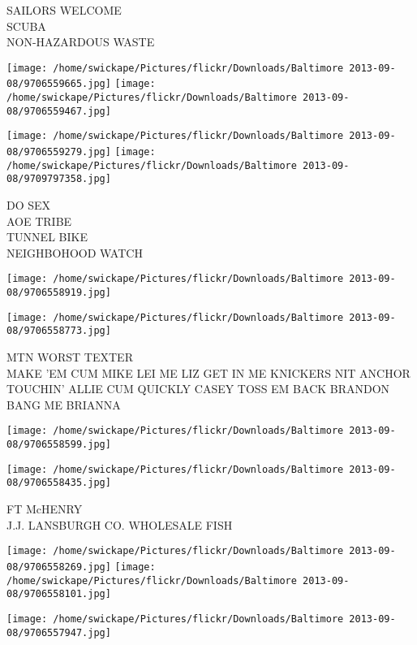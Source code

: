 \documentclass[10pt,letterpaper]{article}
\begin{document}
SAILORS WELCOME\\
SCUBA\\
NON{-}HAZARDOUS WASTE\\
\pagebreak

\texttt{[image: /home/swickape/Pictures/flickr/Downloads/Baltimore 2013-09-08/9706559665.jpg]}
\texttt{[image: /home/swickape/Pictures/flickr/Downloads/Baltimore 2013-09-08/9706559467.jpg]}

\texttt{[image: /home/swickape/Pictures/flickr/Downloads/Baltimore 2013-09-08/9706559279.jpg]}
\texttt{[image: /home/swickape/Pictures/flickr/Downloads/Baltimore 2013-09-08/9709797358.jpg]}

DO SEX\\
AOE TRIBE\\
TUNNEL BIKE\\
NEIGHBOHOOD WATCH\\
\pagebreak

\texttt{[image: /home/swickape/Pictures/flickr/Downloads/Baltimore 2013-09-08/9706558919.jpg]}

\vspace{0.25in}
\texttt{[image: /home/swickape/Pictures/flickr/Downloads/Baltimore 2013-09-08/9706558773.jpg]}

MTN WORST TEXTER\\
MAKE 'EM CUM MIKE LEI ME LIZ GET IN ME KNICKERS NIT ANCHOR TOUCHIN' ALLIE CUM QUICKLY CASEY TOSS EM BACK BRANDON BANG ME BRIANNA\\
\pagebreak

\texttt{[image: /home/swickape/Pictures/flickr/Downloads/Baltimore 2013-09-08/9706558599.jpg]}

\vspace{0.25in}
\texttt{[image: /home/swickape/Pictures/flickr/Downloads/Baltimore 2013-09-08/9706558435.jpg]}

FT McHENRY\\
J.J. LANSBURGH CO. WHOLESALE FISH\\
\pagebreak

\texttt{[image: /home/swickape/Pictures/flickr/Downloads/Baltimore 2013-09-08/9706558269.jpg]}
\texttt{[image: /home/swickape/Pictures/flickr/Downloads/Baltimore 2013-09-08/9706558101.jpg]}

\vspace{0.25in}
\texttt{[image: /home/swickape/Pictures/flickr/Downloads/Baltimore 2013-09-08/9706557947.jpg]}
\end{document}
